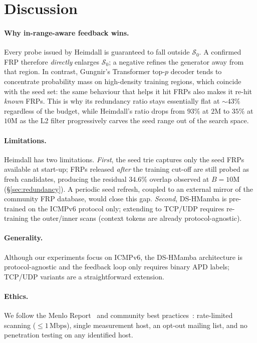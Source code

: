 \documentclass[conference]{IEEEtran}
\begin{document}
\section{Discussion}\label{sec:discussion}

\paragraph{Why in-range-aware feedback wins.}
Every probe issued by Heimdall is guaranteed to fall outside
$\mathcal{S}_{0}$.  A confirmed FRP therefore \emph{directly}
enlarges $\mathcal{S}_{0}$; a negative refines the generator away
from that region.  In contrast, Gungnir's Transformer
top-$p$ decoder tends to concentrate probability mass on
high-density training regions, which coincide with the seed
set: the same behaviour that helps it hit FRPs also makes it
re-hit \emph{known} FRPs.  This is why its redundancy ratio
stays essentially flat at $\sim\!43\%$ regardless of the budget,
while Heimdall's ratio drops from $93\%$ at $2$M to $35\%$ at $10$M
as the L2 filter progressively carves the seed range out of
the search space.

\paragraph{Limitations.}
Heimdall has two limitations.
\emph{First}, the seed trie captures only the seed FRPs
available at start-up; FRPs released \emph{after} the training
cut-off are still probed as fresh candidates, producing the
residual $34.6\%$ overlap observed at $B{=}10$M
(\S\ref{sec:redundancy}).  A periodic seed refresh, coupled to
an external mirror of the community FRP database, would close
this gap.
\emph{Second}, DS-HMamba is pre-trained on the ICMPv6 protocol
only; extending to TCP/UDP requires re-training the outer/inner
scans (context tokens are already protocol-agnostic).

\paragraph{Generality.}
Although our experiments focus on ICMPv6, the DS-HMamba
architecture is protocol-agnostic and the feedback loop only
requires binary APD labels; TCP/UDP variants are a
straightforward extension.

\paragraph{Ethics.}
We follow the Menlo Report~\cite{menloreport} and community
best practices~\cite{partridge2016ethics,eddy2007synflood,guo2018icmp,izhikevich2022lzr,github-crypto-2021,google-v6-stats,gregor2015draw}: rate-limited
scanning ($\leq 1\,\text{Mbps}$), single measurement host,
an opt-out mailing list, and no penetration testing on any
identified host.
\end{document}
